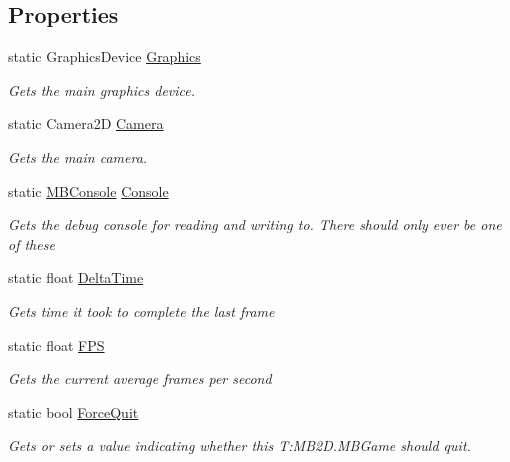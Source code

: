 \subsection*{Properties}
\begin{DoxyCompactItemize}
\item 
static Graphics\+Device \hyperlink{class_m_b2_d_1_1_m_b_game_ab46479cca47c2d5da6528ef81e9ff7c1}{Graphics}
\begin{DoxyCompactList}\small\item\em Gets the main graphics device. \end{DoxyCompactList}\item 
static Camera2D \hyperlink{class_m_b2_d_1_1_m_b_game_adec48f512c50332353b12a569630defe}{Camera}
\begin{DoxyCompactList}\small\item\em Gets the main camera. \end{DoxyCompactList}\item 
static \hyperlink{class_m_b2_d_1_1_m_b_console}{M\+B\+Console} \hyperlink{class_m_b2_d_1_1_m_b_game_a0db7935dd8a9f15b2dce1031920a4127}{Console}
\begin{DoxyCompactList}\small\item\em Gets the debug console for reading and writing to. There should only ever be one of these \end{DoxyCompactList}\item 
static float \hyperlink{class_m_b2_d_1_1_m_b_game_ad5f17615f6a86c891635491cba99337d}{Delta\+Time}
\begin{DoxyCompactList}\small\item\em Gets time it took to complete the last frame \end{DoxyCompactList}\item 
static float \hyperlink{class_m_b2_d_1_1_m_b_game_acb9e6dfedc44ee2df89aa9714f098faf}{F\+PS}
\begin{DoxyCompactList}\small\item\em Gets the current average frames per second \end{DoxyCompactList}\item 
static bool \hyperlink{class_m_b2_d_1_1_m_b_game_a74cd19bc8809a473a639aed105f0f4e9}{Force\+Quit}
\begin{DoxyCompactList}\small\item\em Gets or sets a value indicating whether this T\+:\+M\+B2\+D.\+M\+B\+Game should quit. \end{DoxyCompactList}\end{DoxyCompactItemize}


